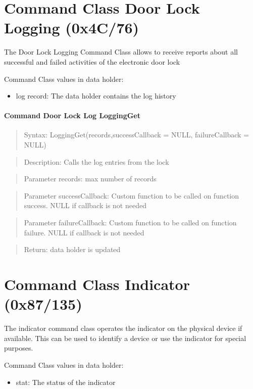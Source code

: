  
\section{Command Class Door Lock Logging (0x4C/76)}

The Door Lock Logging Command Class allows to receive reports about all successful and failed activities 
of the electronic door lock

Command Class values in data holder:
\begin{itemize}
\item log record: The data holder contains the log history
\end{itemize}

\paragraph {Command Door Lock Log LoggingGet}
\begin{quote} Syntax:  LoggingGet(records,successCallback = NULL, failureCallback = NULL)\end{quote}
\begin{quote} Description: Calls the log entries from the lock\end{quote}
\begin{quote} Parameter records: max number of records \end{quote}
\begin{quote} Parameter successCallback: Custom function to be called on function success. NULL if callback is not needed\end{quote}
\begin{quote} Parameter failureCallback: Custom function to be called on function failure. NULL if callback is not needed\end{quote}
\begin{quote} Return: data holder  is updated \end{quote}

 
\section{Command Class Indicator (0x87/135)}

The indicator command class operates the indicator on the physical device if available. This can be used to
identify a device or use the indicator for special purposes.

Command Class values in data holder:
\begin{itemize}
\item stat: The status of the indicator
\end{itemize}

